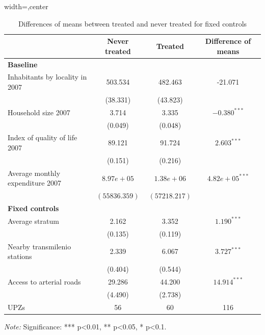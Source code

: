 \documentclass[12pt]{article}
\begin{document}
\begin{table} [H]
  \centering
  \caption{ Differences of means between treated and never treated for fixed controls}
  \label{tab:diferencias_medias_controles_fijos}
  \begin{adjustbox}{width=\textwidth,center}
    \begin{tabular}{l c c c}
      \toprule
      \multicolumn{1}{c}{} & \multicolumn{1}{c}{\textbf{Never treated}} & \multicolumn{1}{c}{\textbf{Treated}} & \multicolumn{1}{c}{\textbf{Difference of means}} \\
      \midrule
       \midrule
      \multicolumn{4}{l}{\textbf{Baseline}} \\
      \midrule
      Inhabitants by locality in 2007 & 503.534 & 482.463 & -21.071 \\
      & (38.331) & (43.823) & \\
      Household size 2007 & 3.714 & 3.335 & $-0.380^{***}$ \\
      & (0.049) & (0.048) & \\
      Index of quality of life 2007 & 89.121 & 91.724 & $2.603^{***}$ \\
      & (0.151) & (0.216) & \\
      Average monthly expenditure 2007 & $8.97e+05$ & $1.38e+06$ & $4.82e+05^{***}$ \\
      & $(55836.359)$ & $(57218.217)$ & \\
      \midrule
      \multicolumn{4}{l}{\textbf{Fixed controls}} \\
      \midrule
      Average stratum & 2.162 & 3.352 & $1.190^{***}$ \\
      & (0.135) & (0.119) & \\
      Nearby transmilenio stations & 2.339 & 6.067 & $3.727^{***}$ \\
      & (0.404) & (0.544) & \\
      Access to arterial roads & 29.286 & 44.200 & $14.914^{***}$ \\
      & (4.490) & (2.738) & \\
      \midrule
      \midrule
      UPZs & 56 & 60 & 116 \\
      \bottomrule
    \end{tabular}
  \end{adjustbox}
   \parbox[t]{\textwidth}{%
    \vspace{0.5em}
    \footnotesize{ \textit{Note:} Significance: *** p<0.01, ** p<0.05, * p<0.1.}}
\end{table}
\end{document}
